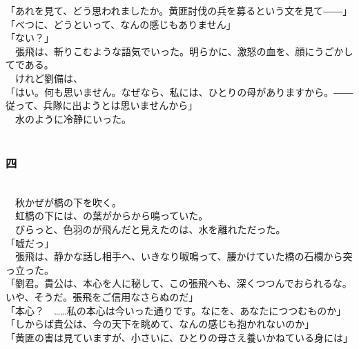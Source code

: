 \documentclass[
  paper=a5,
  fontsize=10pt,
  jafontsize=9.5pt,
  tate,                  %
  open_bracket_pos=nibu, %
]{jlreq}
\begin{document}
「あれを見て、どう思われましたか。黄匪討伐の兵を募るという文を見て――」\\


「べつに、どうといって、なんの感じもありません」\\


「ない？」\\


　張飛は、斬りこむような語気でいった。明らかに、激怒の血を、顔にうごかしてである。\\


　けれど劉備は、\\


「はい。何も思いません。なぜなら、私には、ひとりの母がありますから。――従って、兵隊に出ようとは思いませんから」\\


　水のように冷静にいった。\\

\\

\subsubsection{四}

\\


　秋かぜが橋の下を吹く。\\


　虹橋の下には、の葉がからから鳴っていた。\\


　びらっと、色羽のが飛んだと見えたのは、水を離れただった。\\


「嘘だっ」\\


　張飛は、静かな話し相手へ、いきなり呶鳴って、腰かけていた橋の石欄から突っ立った。\\


「劉君。貴公は、本心を人に秘して、この張飛へも、深くつつんでおられるな。いや、そうだ。張飛をご信用なさらぬのだ」\\


「本心？　……私の本心は今いった通りです。なにを、あなたにつつむものか」\\


「しからば貴公は、今の天下を眺めて、なんの感じも抱かれないのか」\\


「黄匪の害は見ていますが、小さいに、ひとりの母さえ養いかねている身には」\\
\end{document}
